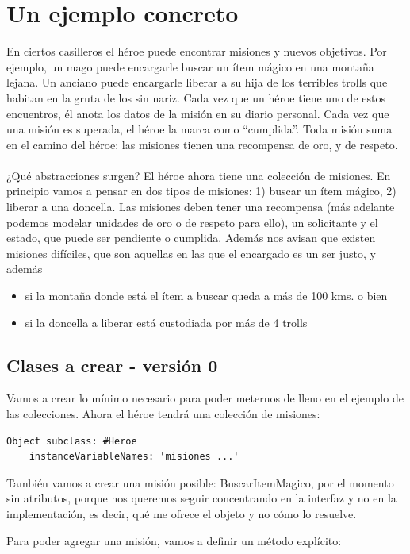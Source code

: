\documentclass[a4paper,12pt]{book}
\begin{document}
\section{Un ejemplo concreto}
En ciertos casilleros el héroe puede encontrar misiones y nuevos objetivos. Por ejemplo, un mago puede
encargarle buscar un ítem mágico en una montaña lejana. Un anciano puede encargarle liberar a su hija de
los terribles trolls que habitan en la gruta de los sin nariz. Cada vez que un héroe tiene uno de estos
encuentros, él anota los datos de la misión en su diario personal. Cada vez que una misión es superada,
el héroe la marca como “cumplida”. Toda misión suma en el camino del héroe: las misiones tienen una
recompensa de oro, y de respeto.
\\
\\
¿Qué abstracciones surgen? El héroe ahora tiene una colección de misiones. En principio vamos a pensar en
dos tipos de misiones: 1) buscar un ítem mágico, 2) liberar a una doncella. Las misiones deben tener una
recompensa (más adelante podemos modelar unidades de oro o de respeto para ello), un solicitante y el estado,
que puede ser pendiente o cumplida. Además nos avisan que existen misiones difíciles, que son
aquellas en las que el encargado es un ser justo, y además
\begin{itemize}
 \item si la montaña donde está el ítem a buscar queda a más de 100 kms. o bien 
 \item si la doncella a liberar está custodiada por más de 4 trolls
\end{itemize}

\subsection{Clases a crear - versión 0}
Vamos a crear lo mínimo necesario para poder meternos de lleno en el ejemplo de las colecciones.
Ahora el héroe tendrá una colección de misiones:

\begin{lstlisting}[frame=single]
Object subclass: #Heroe
	instanceVariableNames: 'misiones ...'
\end{lstlisting}

También vamos a crear una misión posible: BuscarItemMagico, por el momento sin atributos, porque nos queremos
seguir concentrando en la interfaz y no en la implementación, es decir, qué me ofrece el objeto y no cómo lo
resuelve.

Para poder agregar una misión, vamos a definir un método explícito:
\end{document}
